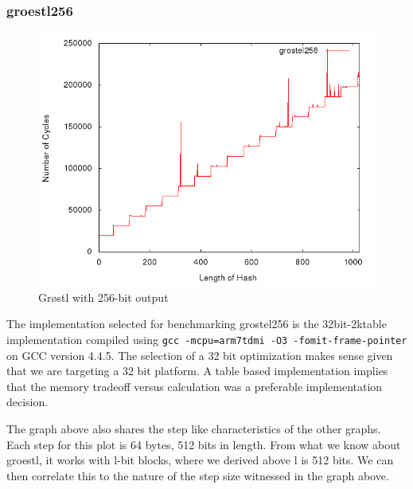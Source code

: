 \documentclass[10pt,a4paper]{article}
\begin{document}
\subsubsection{groestl256}
    \begin{figure}[H]
        \begin{center}
            \includegraphics[scale=0.5]{images/grostel256.png} 
            \caption{Gr{\o}stl with 256-bit output}
        \end{center}
    \end{figure}

The implementation selected for benchmarking grostel256 is the 32bit-2ktable
implementation compiled using \texttt{gcc -mcpu=arm7tdmi -O3
-fomit-frame-pointer} on GCC version 4.4.5. The selection of a 32 bit
optimization makes sense given that we are targeting a 32 bit platform. A table
based implementation implies that the memory tradeoff versus calculation was a
preferable implementation decision.

The graph above also shares the step like characteristics of the other graphs. Each step for this plot is 64 bytes, 512 bits in length. From what we know about groestl, it works with l-bit blocks, where we derived above l is 512 bits. We can then correlate this to the nature of the step size witnessed in the graph above.
\end{document}
